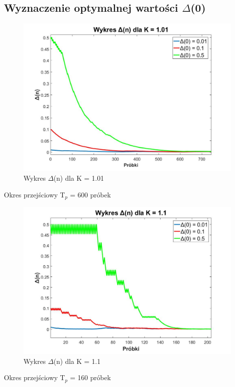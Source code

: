 \documentclass[12pt, a4paper, oneside]{article}
\begin{document}
\subsection{Wyznaczenie optymalnej wartości $\Delta$(0)}
\begin{figure}[h]
\centering
\caption{Wykres $\Delta$(n) dla K = 1.01}
\includegraphics[scale=0.33]{f1.jpg}
\end{figure}
\begin{center}
Okres przejściowy T$_p$ = 600 próbek
\end{center}
\begin{figure}[h]
\centering
\caption{Wykres $\Delta$(n) dla K = 1.1}
\includegraphics[scale=0.33]{f2.jpg}
\end{figure}
\begin{center}
Okres przejściowy T$_p$ = 160 próbek
\end{center}
\end{document}
